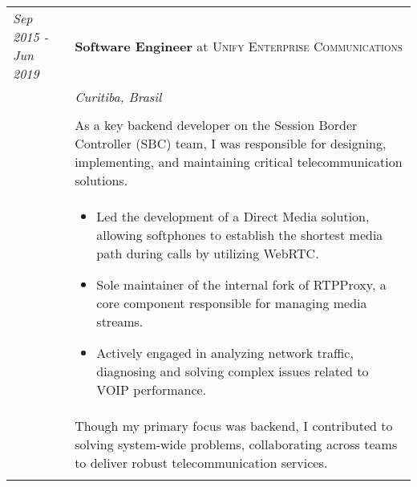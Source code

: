 \documentclass[a4paper,10pt]{article}
\begin{document}
    \begin{tabular}{@{} p{2.8cm} | p{12.2cm} @{}}
        \emph{Sep 2015 - Jun 2019}
        &\textbf{Software Engineer} at \textsc
        {Unify Enterprise Communications} \\

        &\emph
        {Curitiba, Brasil} \\ \\
        &\normalsize
        {
            As a key backend developer on the Session Border Controller
            (SBC) team, I was responsible for designing, implementing,
            and maintaining critical telecommunication solutions.
        } \\
        & \begin{itemize}[leftmargin=*]
            \item Led the development of a Direct Media solution, allowing
                softphones to establish the shortest media path
                during calls by utilizing WebRTC.

            \item Sole maintainer of the internal fork of RTPProxy, a core
                component responsible for managing media streams.

            \item Actively engaged in analyzing network traffic, diagnosing
                and solving complex issues related to VOIP performance.
        \end{itemize} \\
        &\normalsize
        {
            Though my primary focus was backend, I contributed to solving
            system-wide problems, collaborating across teams to deliver
            robust telecommunication services.
        } \\

        \multicolumn{2}{c}{}
    \end{tabular}
\end{document}
